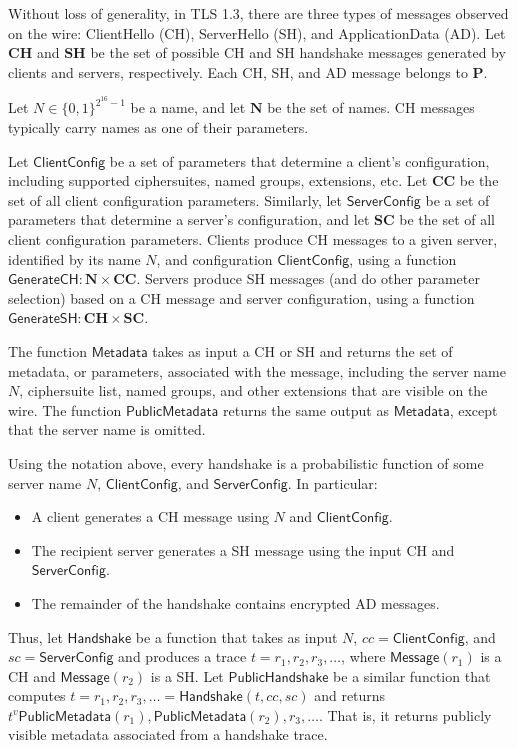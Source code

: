 \documentclass{article}
\begin{document}
Without loss of generality, in TLS 1.3, there are three types of messages observed
on the wire: ClientHello (CH), ServerHello (SH), and ApplicationData (AD). Let $\mathbf{CH}$ 
and $\mathbf{SH}$ be the set of possible CH and SH handshake messages generated by 
clients and servers, respectively. Each CH, SH, and AD message belongs to $\mathbf{P}$.

Let $N \in \{0,1\}^{2^{16} - 1}$ be a name, and let $\mathbf{N}$ be the set of names. 
CH messages typically carry names as one of their parameters.

Let $\mathsf{ClientConfig}$ be a set of parameters that determine a client's configuration,
including supported ciphersuites, named groups, extensions, etc. 
Let $\mathbf{CC}$ be the set of all client configuration parameters.
Similarly, let $\mathsf{ServerConfig}$ be a set of parameters that determine a server's configuration,
and let $\mathbf{SC}$ be the set of all client configuration parameters.
Clients produce CH messages to a given server, identified by its name $N$, and configuration
$\mathsf{ClientConfig}$, using a function $\mathsf{GenerateCH}: \mathbf{N} \times \mathbf{CC}$.
Servers produce SH messages (and do other parameter selection) based on a CH message and 
server configuration, using a function $\mathsf{GenerateSH}: \mathbf{CH} \times \mathbf{SC}$.

The function $\mathsf{Metadata}$ takes as input a CH or SH and returns the set of metadata,
or parameters, associated with the message, including the server name $N$, ciphersuite list,
named groups, and other extensions that are visible on the wire. The function
$\mathsf{PublicMetadata}$ returns the same output as $\mathsf{Metadata}$, except that
the server name is omitted. 

Using the notation above, every handshake is a probabilistic function of some server name $N$,
$\mathsf{ClientConfig}$, and $\mathsf{ServerConfig}$. In particular:
%
\begin{itemize}
    \item A client generates a CH message using $N$ and $\mathsf{ClientConfig}$.
    \item The recipient server generates a SH message using the input CH and $\mathsf{ServerConfig}$.
    \item The remainder of the handshake contains encrypted AD messages.
\end{itemize}
%
Thus, let $\mathsf{Handshake}$ be a function that takes as input $N$,
$cc = \mathsf{ClientConfig}$, and $sc = \mathsf{ServerConfig}$ and produces a trace 
$t = r_1, r_2, r_3, \dots$, where $\mathsf{Message}(r_1)$ is a CH and 
$\mathsf{Message}(r_2)$ is a SH. Let $\mathsf{PublicHandshake}$ be a similar
function that computes $t = r_1, r_2, r_3, \dots = \mathsf{Handshake}(t, cc, sc)$ and returns 
$t^v \mathsf{PublicMetadata}(r_1), \mathsf{PublicMetadata}(r_2), r_3, \dots$. That is,
it returns publicly visible metadata associated from a handshake trace. 
\end{document}
